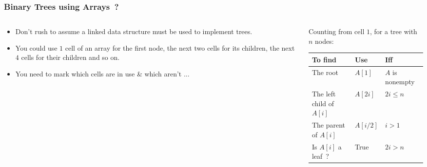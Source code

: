 
\begin{frame}[fragile]
\frametitle{Binary Trees using Arrays~?}
\begin{columns}[T]

\begin{column}{0.35\textwidth}
\begin{itemize}[<+->]
\item Don't rush to assume a linked data structure must be used to
implement trees.
\item You could use $1$ cell of an array for the
first node, the next two cells for its children, the next $4$
cells for their children and so on.
\item You need to mark which cells are in use \& which aren't ...
\end{itemize}
\end{column}

\pause
\begin{column}{0.55\textwidth}
Counting from cell $1$, for a tree with $n$ nodes:
\begin{center}	
\begin{tabular}{|l|l|l|}\hline	
To find & Use & Iff\\ \hline	
The root & $A[1]$ & $A$ is nonempty \\	
The left child of $A[i]$ & $A[2i]$ & $2i \leq n$ \\	
The parent of $A[i]$ & $A[i/2]$ & $i > 1$\\	
Is $A[i]$ a leaf~? & True & $2i > n$\\ \hline	
\end{tabular}	
\end{center}	
\end{column}

\end{columns}
\end{frame}


